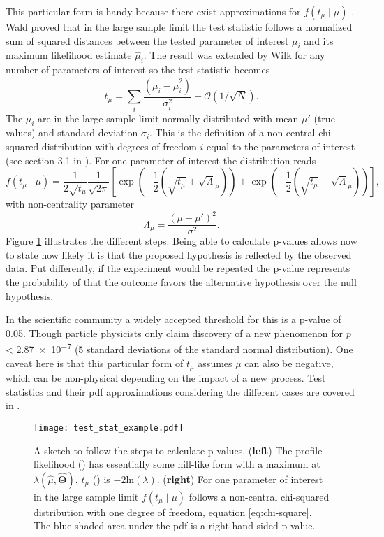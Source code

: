 This particular form is handy because there exist approximations for $f(t_\mu \mid \mu)$ \citep{cowan2011asymptotic}. Wald \citep{wald1943tests} proved that in the large sample limit the test statistic follows a normalized sum of squared distances between the tested parameter of interest $\mu_i$ and its maximum likelihood estimate $\hat{\mu}_i$. The result was extended by Wilk \citep{wilks1938large} for any number of parameters of interest so the test statistic becomes
\begin{equation}
    t_\mu=\sum_i \frac{(\mu_i-\hat{\mu}_i^2)}{\sigma_i^2} + \mathcal{O}(1/\sqrt{N}).
\end{equation}
The $\hat{\mu}_i$ are in the large sample limit normally distributed with mean $\mu'$ (true values) and standard deviation $\sigma_i$. This is the definition of a non-central chi-squared distribution with degrees of freedom $i$ equal to the parameters of interest (see section 3.1 in \citep{cowan2011asymptotic}). For one parameter of interest the distribution reads
\begin{equation}\label{eq:chi-square}
    f(t_\mu \mid \mu)=\frac{1}{2\sqrt{t_\mu}}\frac{1}{\sqrt{2\pi}}
    \left[
\exp\left(-\frac{1}{2}\left(\sqrt{t_\mu}+\sqrt{\Lambda}_\mu\right)\right)
+
\exp\left(-\frac{1}{2}\left(\sqrt{t_\mu}-\sqrt{\Lambda}_\mu\right)\right)
\right],
\end{equation}
with non-centrality parameter 
\begin{equation}
    \Lambda_\mu=\frac{(\mu-\mu')^2}{\sigma^2}.
\end{equation}
Figure \ref{fig:test_stat_example} illustrates the different steps. Being able to calculate p-values allows now to state how likely it is that the proposed hypothesis is reflected by the observed data. Put differently, if the experiment would be repeated the p-value represents the probability of that the outcome favors the alternative hypothesis over the null hypothesis.

In the scientific community a widely accepted threshold for this is a p-value of 0.05. Though particle physicists only claim discovery of a new phenomenon for $p$ < \SI{2.87e-7}{} (5 standard deviations of the standard normal distribution). One caveat here is that this particular form of $t_\mu$ assumes $\mu$ can also be negative, which can be non-physical depending on the impact of a new process. Test statistics and their pdf approximations considering the different cases are covered in \citep{cowan2011asymptotic}. 
\begin{figure}
    \centering
    \texttt{[image: test\_stat\_example.pdf]}
        \caption[]{A sketch to follow the steps to calculate p-values. (\textbf{left}) The profile likelihood () has essentially some hill-like form with a maximum at ${\lambda(\hat{\mu},\hat{\bm{\Theta}})}$, $t_\mu$ () is $-2\mathrm{ln}(\lambda)$. (\textbf{right}) For one parameter of interest in the large sample limit $f(t_\mu \mid \mu)$ follows a non-central chi-squared distribution with one degree of freedom, equation \ref{eq:chi-square}. The blue shaded area under the pdf is a right hand sided p-value.}
    \label{fig:test_stat_example}    
\end{figure}

